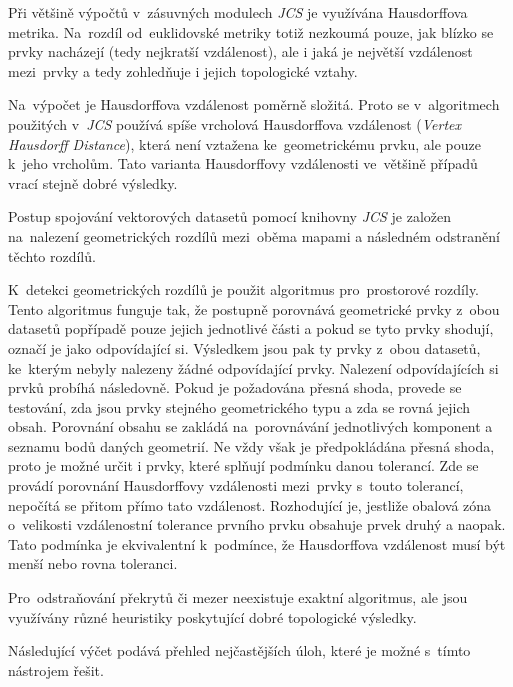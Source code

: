 Při většině výpočtů v~zásuvných modulech \textit{JCS} je využívána Hausdorffova metrika. Na~rozdíl od~euklidovské metriky totiž nezkoumá pouze, jak blízko se prvky nacházejí
(tedy nejkratší vzdálenost), ale i jaká je největší vzdálenost mezi~prvky a tedy zohledňuje i jejich topologické vztahy. 

Na~výpočet je Hausdorffova vzdálenost poměrně složitá. Proto se v~algoritmech použitých v~\textit{JCS} používá spíše vrcholová Hausdorffova vzdálenost (\textit{Vertex Hausdorff
 Distance}), která není vztažena ke~geometrickému prvku, ale pouze k~jeho vrcholům. Tato varianta Hausdorffovy vzdálenosti ve~většině případů vrací stejně dobré výsledky. 

Postup spojování vektorových datasetů pomocí knihovny \textit{JCS} je založen na~nalezení geometrických rozdílů mezi~oběma mapami a následném odstranění těchto rozdílů.

K~detekci geometrických rozdílů je použit algoritmus pro~prostorové rozdíly. Tento algoritmus funguje tak, že postupně porovnává geometrické prvky z~obou datasetů popřípadě
 pouze jejich jednotlivé části a pokud se tyto prvky shodují, označí je jako odpovídající si. Výsledkem jsou pak ty prvky z~obou datasetů, ke~kterým nebyly nalezeny žádné 
odpovídající prvky. Nalezení odpovídajících si prvků probíhá následovně. Pokud je požadována přesná shoda, provede se testování, zda jsou prvky stejného geometrického typu a
zda se rovná jejich obsah. Porovnání obsahu se zakládá na~porovnávání jednotlivých komponent a seznamu bodů daných geometrií. Ne vždy však je předpokládána přesná shoda,
proto je možné určit i prvky, které splňují podmínku danou tolerancí. Zde se provádí porovnání Hausdorffovy vzdálenosti mezi~prvky s~touto tolerancí, nepočítá se přitom přímo
tato vzdálenost. Rozhodující je, jestliže obalová zóna o~velikosti vzdálenostní tolerance prvního prvku obsahuje prvek druhý a naopak. Tato podmínka je ekvivalentní k~podmínce,
že Hausdorffova vzdálenost musí být menší nebo rovna toleranci. 

Pro~odstraňování překrytů či mezer neexistuje exaktní algoritmus, ale jsou využívány různé heuristiky poskytující dobré topologické výsledky.

Následující výčet podává přehled nejčastějších úloh, které je možné s~tímto nástrojem řešit.

